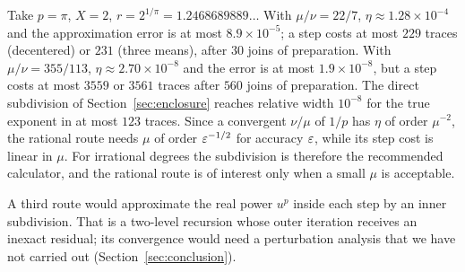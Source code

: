 \begin{remark}\label{rem:pi}
Take $p=\pi$, $X=2$, $r=2^{1/\pi}=1.2468689889\ldots$ With $\mu/\nu=22/7$, $\eta\approx1.28\times10^{-4}$
and the approximation error is at most $8.9\times10^{-5}$; a step costs at most $229$ traces (decentered)
or $231$ (three means), after $30$ joins of preparation. With $\mu/\nu=355/113$,
$\eta\approx2.70\times10^{-8}$ and the error is at most $1.9\times10^{-8}$, but a step costs at most
$3559$ or $3561$ traces after $560$ joins of preparation. The direct subdivision of
Section~\ref{sec:enclosure} reaches relative width $10^{-8}$ for the true exponent in at most $123$
traces. Since a convergent $\nu/\mu$ of $1/p$ has $\eta$ of order $\mu^{-2}$, the rational route needs
$\mu$ of order $\varepsilon^{-1/2}$ for accuracy $\varepsilon$, while its step cost is linear in $\mu$. For irrational
degrees the subdivision is therefore the recommended calculator, and the rational route is of interest
only when a small $\mu$ is acceptable.
\end{remark}

A third route would approximate the real power $u^{p}$ inside each step by an inner subdivision. That
is a two-level recursion whose outer iteration receives an inexact residual; its convergence would need
a perturbation analysis that we have not carried out (Section~\ref{sec:conclusion}).
